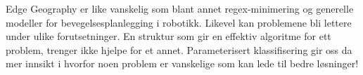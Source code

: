 
Edge Geography er like vanskelig som blant annet regex-minimering og generelle modeller for bevegelsesplanlegging i robotikk.
Likevel kan problemene bli lettere under ulike forutsetninger. En struktur som gir en effektiv algoritme for ett problem, trenger ikke hjelpe for et annet.
Parameterisert klassifisering gir oss da 
mer innsikt i hvorfor noen problem er vanskelige som 
kan lede til bedre løsninger!



\PosterPara 




